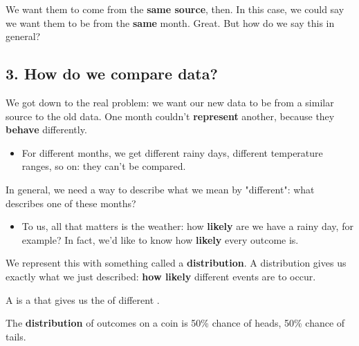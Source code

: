         We want them to come from the \textbf{same source}, then. In this case, we could say we want them to be from the \textbf{same} month. Great. But how do we say this in general?
        
    \subsection*{3. How do we compare data?}
        
        We got down to the real problem: we want our new data to be from a similar source to the old data. One month couldn't \textbf{represent} another, because they \textbf{behave} differently.
        
        \begin{itemize}
            \item \miniex For different months, we get different rainy days, different temperature ranges, so on: they can't be compared.
        \end{itemize} 
        
        In general, we need a way to describe what we mean by "different": what describes one of these months?
        
        \begin{itemize}
            \item \miniex To us, all that matters is the weather: how \textbf{likely} are we have a rainy day, for example? In fact, we'd like to know how \textbf{likely} every outcome is.
        \end{itemize}
        
        We represent this with something called a \textbf{distribution}. A distribution gives us exactly what we just described: \textbf{how likely} different events are to occur. 
        \\
        
        \begin{definition}
            A  is a  that gives us the  of different .
        \end{definition}
        
        
        \miniex The \textbf{distribution} of outcomes on a coin is 50\% chance of heads, 50\% chance of tails.
        
